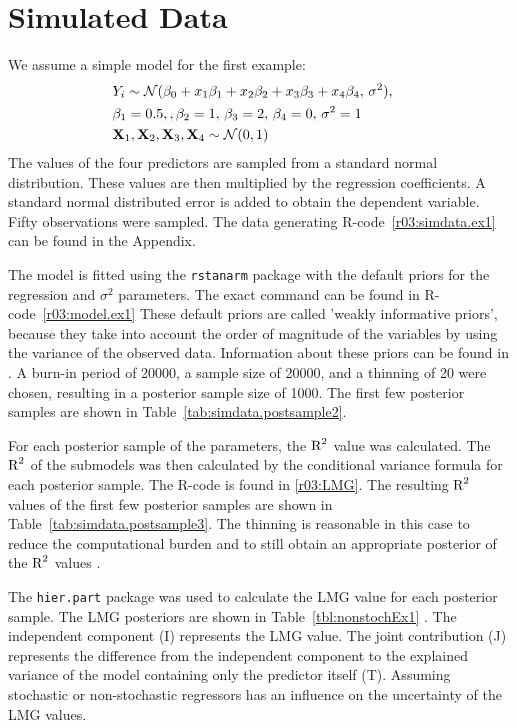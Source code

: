 \documentclass[11pt,a4paper,twoside]{book}\usepackage[]{graphicx}\usepackage[]{color}
\begin{document}
\section{Simulated Data}

We assume a simple model for the first example: 
\begin{align*} 
&Y_{i} \sim \mathcal{N}(\beta_{0}+x_{1} \beta_{1}+x_{2} \beta_{2}+x_{3} \beta_{3}+x_{4} \beta_{4}, \, \sigma^2),& \\ & \beta_{1} = 0.5, , \beta_{2} = 1, \, \beta_{3} = 2 , \, \beta_{4}=0, \, \sigma^2 = 1 & \\ & {\mathbf{X}}_{1}, {\mathbf{X}}_{2},{\mathbf{X}}_{3},{\mathbf{X}}_{4} \sim \mathcal{N}(0, 1) 
\end{align*} 
The values of the four predictors are sampled from a standard normal distribution. These values are then multiplied by the regression coefficients. A standard normal distributed error is added to obtain the dependent variable. Fifty observations were sampled. The data generating R-code~\ref{r03:simdata.ex1} can be found in the Appendix.




The model is fitted using the \texttt{rstanarm} package \citep{rstanarm} with the default priors for the regression and $\sigma^2$ parameters. The exact command can be found in R-code~\ref{r03:model.ex1} These default priors are called 'weakly informative priors', because they take into account the order of magnitude of the variables by using the variance of the observed data. Information about these priors can be found in \cite{stanM2017}. A burn-in period of 20000, a sample size of 20000, and a thinning of 20 were chosen, resulting in a posterior sample size of 1000. The first few posterior samples are shown in Table~\ref{tab:simdata.postsample2}. 

For each posterior sample of the parameters, the $\text{R}^2$ value was calculated. The $\text{R}^2$ of the submodels was then calculated by the conditional variance formula for each posterior sample. The R-code is found in \ref{r03:LMG}. The resulting $\text{R}^2$ values of the first few posterior samples are shown in Table~\ref{tab:simdata.postsample3}.  The thinning is reasonable in this case to reduce the computational burden and to still obtain an appropriate posterior of the $\text{R}^2$ values \citep{Link2012}. 

The \texttt{hier.part} package was used to calculate the LMG value for each posterior sample. The LMG posteriors are shown in Table~\ref{tbl:nonstochEx1} . The independent component (I) represents the LMG value. The joint contribution (J) represents the difference from the independent component to the explained variance of the model containing only the predictor itself (T). Assuming stochastic or non-stochastic regressors has an influence on the uncertainty of the LMG values. 
\end{document}
